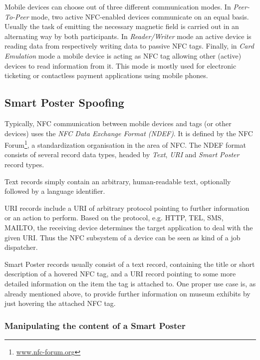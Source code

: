 \documentclass[12pt,a4paper]{article}
\begin{document}
Mobile devices can choose out of three different communication modes. In \emph{Peer-To-Peer} mode, two active NFC-enabled devices communicate on an equal basis. Usually the task of emitting the necessary magnetic field is carried out in an alternating way by both participants. In \emph{Reader/Writer} mode an active device is reading data from respectively writing data to passive NFC tags. Finally, in \emph{Card Emulation} mode a mobile device is acting as NFC tag allowing other (active) devices to read information from it. This mode is mostly used for electronic ticketing or contactless payment applications using mobile phones.

\subsection{Smart Poster Spoofing}

Typically, NFC communication between mobile devices and tags (or other devices) uses the \emph{NFC Data Exchange Format (NDEF)}. It is defined by the NFC Forum\footnote{\url{www.nfc-forum.org}}, a standardization organisation in the area of NFC. The NDEF format consists of several record data types, headed by \emph{Text}, \emph{URI} and \emph{Smart Poster} record types.\cite{DBLP:conf/IEEEares/Mulliner09}\cite{DBLP:conf/mobisys/GummesonPGTZ13}

Text records simply contain an arbitrary, human-readable text, optionally followed by a language identifier.

URI records include a URI of arbitrary protocol pointing to further information or an action to perform. Based on the protocol, e.g. HTTP, TEL, SMS, MAILTO, the receiving device determines the target application to deal with the given URI. Thus the NFC subsystem of a device can be seen as kind of a job dispatcher.

Smart Poster records usually consist of a text record, containing the title or short description of a hovered NFC tag, and a URI record pointing to some more detailed information on the item the tag is attached to. One proper use case is, as already mentioned above, to provide further information on museum exhibits by just hovering the attached NFC tag.

\subsubsection{Manipulating the content of a Smart Poster}
\end{document}
